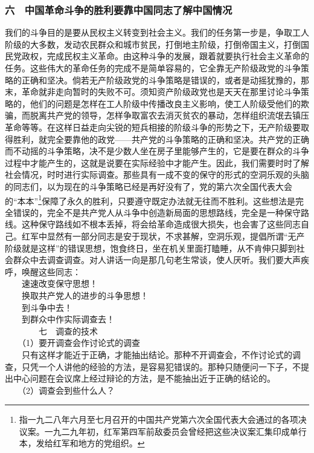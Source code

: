 \documentclass[cn,11pt,chinese]{elegantbook}
\def\myformat#1{\hfil\hfil #1}
\begin{document}
\subsubsection*{\myformat{六　中国革命斗争的胜利要靠中国同志了解中国情况}}
我们的斗争目的是要从民权主义转变到社会主义。我们的任务第一步是，争取工人阶级的大多数，发动农民群众和城市贫民，打倒地主阶级，打倒帝国主义，打倒国民党政权，完成民权主义革命。由这种斗争的发展，跟着就要执行社会主义革命的任务。这些伟大的革命任务的完成不是简单容易的，它全靠无产阶级政党的斗争策略的正确和坚决。倘若无产阶级政党的斗争策略是错误的，或者是动摇犹豫的，那末，革命就非走向暂时的失败不可。须知资产阶级政党也是天天在那里讨论斗争策略的，他们的问题是怎样在工人阶级中传播改良主义影响，使工人阶级受他们的欺骗，而脱离共产党的领导，怎样争取富农去消灭贫农的暴动，怎样组织流氓去镇压革命等等。在这样日益走向尖锐的短兵相接的阶级斗争的形势之下，无产阶级要取得胜利，就完全要靠他的政党——共产党的斗争策略的正确和坚决。共产党的正确而不动摇的斗争策略，决不是少数人坐在房子里能够产生的，它是要在群众的斗争过程中才能产生的，这就是说要在实际经验中才能产生。因此，我们需要时时了解社会情况，时时进行实际调查。那些具有一成不变的保守的形式的空洞乐观的头脑的同志们，以为现在的斗争策略已经是再好没有了，党的第六次全国代表大会的“本本”\footnote[8]{ 指一九二八年六月至七月召开的中国共产党第六次全国代表大会通过的各项决议案。一九二九年初，红军第四军前敌委员会曾经把这些决议案汇集印成单行本，发给红军和地方的党组织。}保障了永久的胜利，只要遵守既定办法就无往而不胜利。这些想法是完全错误的，完全不是共产党人从斗争中创造新局面的思想路线，完全是一种保守路线。这种保守路线如不根本丢掉，将会给革命造成很大损失，也会害了这些同志自己。红军中显然有一部分同志是安于现状，不求甚解，空洞乐观，提倡所谓“无产阶级就是这样”的错误思想，饱食终日，坐在机关里面打瞌睡，从不肯伸只脚到社会群众中去调查调查。对人讲话一向是那几句老生常谈，使人厌听。我们要大声疾呼，唤醒这些同志：\\
　　速速改变保守思想！\\
　　换取共产党人的进步的斗争思想！\\
　　到斗争中去！\\
　　到群众中作实际调查去！\\
　　　　七　调查的技术\\
　　（1）要开调查会作讨论式的调查\\
　　只有这样才能近于正确，才能抽出结论。那种不开调查会，不作讨论式的调查，只凭一个人讲他的经验的方法，是容易犯错误的。那种只随便问一下子，不提出中心问题在会议席上经过辩论的方法，是不能抽出近于正确的结论的。\\
　　（2）调查会到些什么人？\\
\end{document}
